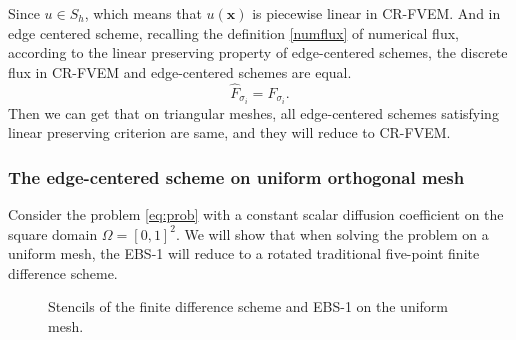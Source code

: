 \documentclass[times,review,preprint,authoryear]{elsarticle}
\newcommand{\bx}{\bm{x}}
\begin{document}
Since $u \in S_h$, which means that $u(\bx)$ is piecewise linear in CR-FVEM. And in edge centered scheme, recalling the definition \cref{numflux} of numerical flux, according to the linear preserving property of edge-centered schemes, the discrete flux in CR-FVEM and edge-centered schemes are equal.
$$ \hat{F}_{\sigma_{i}} = F_{\sigma_{i}}. $$
Then we can get that on triangular meshes, all edge-centered schemes satisfying linear preserving criterion are same, and they will reduce to CR-FVEM.

\subsubsection{The edge-centered scheme on uniform orthogonal mesh}

Consider the problem \cref{eq:prob} with a constant scalar diffusion coefficient on the square domain $\Omega = [0,1]^2$. We will show that when solving the problem on a uniform mesh, the EBS-1 will reduce to a rotated traditional five-point finite difference scheme.

\begin{figure}[h]
\centering
{}
\caption{Stencils of the finite difference scheme and EBS-1 on the uniform mesh.}
\end{figure}
\end{document}
